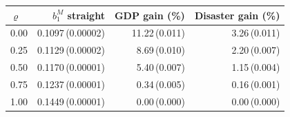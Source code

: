 \begin{tabular}{@{}lrrr@{}}
\toprule
$\varrho$ & $b_1^M$ straight & GDP gain (\%) & Disaster gain (\%) \\ \midrule
0.00 & 0.1097\,(0.00002) & 11.22\,(0.011) & 3.26\,(0.011) \\
0.25 & 0.1129\,(0.00002) & 8.69\,(0.010) & 2.20\,(0.007) \\
0.50 & 0.1170\,(0.00001) & 5.40\,(0.007) & 1.15\,(0.004) \\
0.75 & 0.1237\,(0.00001) & 0.34\,(0.005) & 0.16\,(0.001) \\
1.00 & 0.1449\,(0.00001) & 0.00\,(0.000) & 0.00\,(0.000) \\
\bottomrule
\end{tabular}
